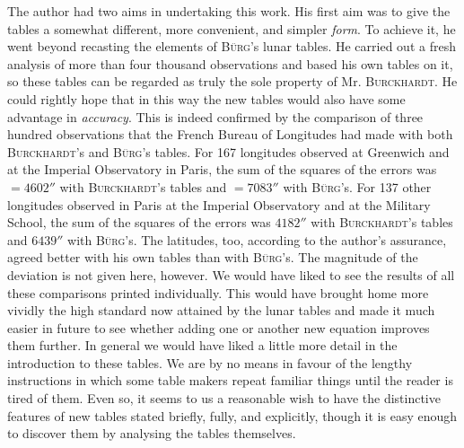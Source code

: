 The author had two aims in undertaking this work. His first aim was to give the tables a somewhat different, more convenient, and simpler \emph{form}. To achieve it, he went beyond recasting the elements of \textsc{Bürg}'s lunar tables. He carried out a fresh analysis of more than four thousand observations and based his own tables on it, so these tables can be regarded as truly the sole property of Mr. \textsc{Burckhardt}. He could rightly hope that in this way the new tables would also have some advantage in \emph{accuracy}. This is indeed confirmed by the comparison of three hundred observations that the French Bureau of Longitudes had made with both \textsc{Burckhardt}'s and \textsc{Bürg}'s tables. For 167 longitudes observed at Greenwich and at the Imperial Observatory in Paris, the sum of the squares of the errors was $= 4602''$ with \textsc{Burckhardt}'s tables and $= 7083''$ with \textsc{Bürg}'s. For 137 other longitudes observed in Paris at the Imperial Observatory and at the Military School, the sum of the squares of the errors was $4182''$ with \textsc{Burckhardt}'s tables and $6439''$ with \textsc{Bürg}'s. The latitudes, too, according to the author's assurance, agreed better with his own tables than with \textsc{Bürg}'s. The magnitude of the deviation is not given here, however. We would have liked to see the results of all these comparisons printed individually. This would have brought home more vividly the high standard now attained by the lunar tables and made it much easier in future to see whether adding one or another new equation improves them further. In general we would have liked a little more detail in the introduction to these tables. We are by no means in favour of the lengthy instructions in which some table makers repeat familiar things until the reader is tired of them. Even so, it seems to us a reasonable wish to have the distinctive features of new tables stated briefly, fully, and explicitly, though it is easy enough to discover them by analysing the tables themselves.

